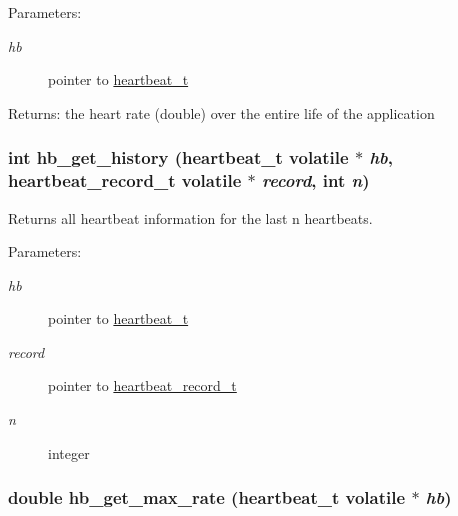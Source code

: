 \begin{Desc}
\item[Parameters:]
\begin{description}
\item[{\em hb}]pointer to \hyperlink{structheartbeat__t}{heartbeat\_\-t} \end{description}
\end{Desc}
\begin{Desc}
\item[Returns:]the heart rate (double) over the entire life of the application \end{Desc}
\hypertarget{heartbeat-shared_8c_d75f7029162a84476c6e7411f59f86f2}{
\subsubsection[hb\_\-get\_\-history]{\setlength{\rightskip}{0pt plus 5cm}int hb\_\-get\_\-history ({\bf heartbeat\_\-t} volatile $\ast$ {\em hb}, \/  {\bf heartbeat\_\-record\_\-t} volatile $\ast$ {\em record}, \/  int {\em n})}}
\label{heartbeat-shared_8c_d75f7029162a84476c6e7411f59f86f2}


Returns all heartbeat information for the last n heartbeats. 

\begin{Desc}
\item[Parameters:]
\begin{description}
\item[{\em hb}]pointer to \hyperlink{structheartbeat__t}{heartbeat\_\-t} \item[{\em record}]pointer to \hyperlink{structheartbeat__record__t}{heartbeat\_\-record\_\-t} \item[{\em n}]integer \end{description}
\end{Desc}
\hypertarget{heartbeat-shared_8c_566d7911466aa84b09b1cb5c16fd1bb0}{
\subsubsection[hb\_\-get\_\-max\_\-rate]{\setlength{\rightskip}{0pt plus 5cm}double hb\_\-get\_\-max\_\-rate ({\bf heartbeat\_\-t} volatile $\ast$ {\em hb})}}
\label{heartbeat-shared_8c_566d7911466aa84b09b1cb5c16fd1bb0}


